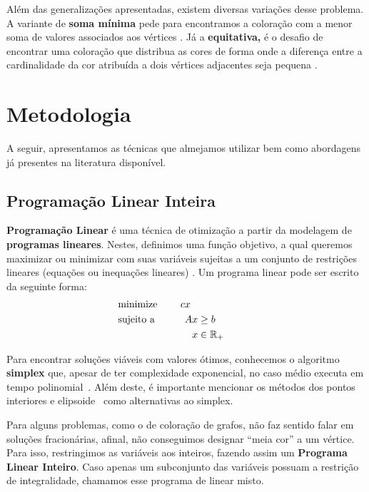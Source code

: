\documentclass[11pt]{article}
\begin{document}
Além das generalizações apresentadas, existem diversas variações desse problema.
A variante de \textbf{soma mínima} pede para encontramos a coloração com a menor soma de valores associados aos vértices \autocite{Jin2016Algorithmsminimumsum}.
Já a \textbf{equitativa,} é o desafio de encontrar uma coloração que distribua as cores de forma onde a diferença entre a cardinalidade da cor atribuída a dois vértices adjacentes seja pequena \autocite{Meyer1973EquitableColoring}.

\section{Metodologia}
\label{sec:org53eabb2}
\label{metodologia}
A seguir, apresentamos as técnicas que almejamos utilizar bem como abordagens já presentes na literatura disponível.

\subsection{Programação Linear Inteira}
\label{sec:org815ba0a}
\textbf{Programação Linear} é uma técnica de otimização a partir da modelagem de \textbf{programas lineares}.
Nestes, definimos uma função objetivo, a qual queremos maximizar ou minimizar com suas variáveis sujeitas a um conjunto de restrições lineares (equações ou inequações lineares) \autocite{Chvatal1983LinearProgramming}. Um programa linear pode ser escrito da seguinte forma:
\begin{alignat*}{4}
& \omit\rlap{minimize \quad \quad $\displaystyle cx$} \\
& \mbox{sujeito a}&& \quad & Ax & \geq b  & \quad &  \\
&                 &&       & x               & \in \mathbb{R}_+ &      &
\end{alignat*}

Para encontrar soluções viáveis com valores ótimos, conhecemos o algoritmo \textbf{simplex} que, apesar de ter complexidade exponencial, no caso médio executa em tempo polinomial~\autocite{Borgwardt1986SimplexMethodAlgorithms}.
Além deste, é importante mencionar os métodos dos pontos interiores \autocite{Karmarkar1984newpolynomialtime} e elipsoide~\autocite{Bland1981FeatureArticleTheEllipsoid} como alternativas ao simplex.

Para alguns problemas, como o de coloração de grafos, não faz sentido falar em soluções fracionárias, afinal, não conseguimos designar ``meia cor'' a um vértice.
Para isso, restringimos as variáveis aos inteiros, fazendo assim um \textbf{Programa Linear Inteiro}. Caso apenas um subconjunto das variáveis possuam a restrição de integralidade, chamamos esse programa de linear misto.
\end{document}
